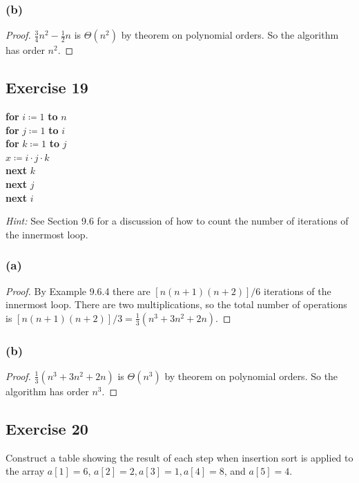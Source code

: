 \documentclass[14pt]{extarticle}
\begin{document}
\subsubsection{(b)}
\begin{proof}
    \(\frac{3}{4}n^2 - \frac{1}{2}n\) is \(\Theta(n^2)\) by theorem on polynomial orders. So the algorithm has order
    \(n^2\).
\end{proof}

\subsection{Exercise 19}
\begin{tabbing}
    {\bf for} \= \(i \coloneqq 1\) {\bf to} \(n\) \\
    \> {\bf for} \= \(j \coloneqq 1\) {\bf to} \(i\) \\
    \>           \> {\bf for} \= \(k \coloneqq 1\) {\bf to} \(j\) \\
    \>           \>           \> \(x \coloneqq i \cdot j \cdot k\) \\
    \>           \> {\bf next} \(k\) \\
    \> {\bf next} \(j\) \\
    {\bf next} \(i\)
\end{tabbing}

{\it Hint:} See Section 9.6 for a discussion of how to count the number of iterations of the innermost loop.

\subsubsection{(a)}
\begin{proof}
    By Example 9.6.4 there are \([n(n + 1)(n + 2)]/6\) iterations of the innermost loop. There are two multiplications, so the
    total number of operations is \([n(n + 1)(n + 2)]/3 = \frac{1}{3}(n^3 + 3n^2 + 2n)\).
\end{proof}

\subsubsection{(b)}
\begin{proof}
    \(\frac{1}{3}(n^3 + 3n^2 + 2n)\) is \(\Theta(n^3)\) by theorem on polynomial orders. So the algorithm has order \(n^3\).
\end{proof}

\subsection{Exercise 20}
Construct a table showing the result of each step when insertion sort is applied to the array \(a[1] = 6\),
\(a[2] = 2, a[3] = 1, a[4] = 8\), and \(a[5] = 4\).
\end{document}
